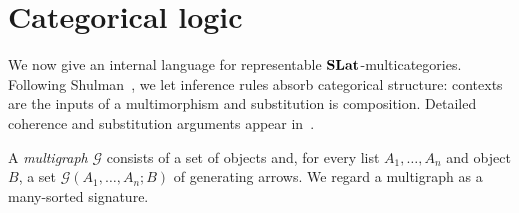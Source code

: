 \section{Categorical logic}
\label{sec:type-theory}

We now give an internal language for representable
$\mathbf{SLat}$-multicategories.  Following Shulman~\cite{shulman2016categorical},
we let inference rules absorb categorical structure: contexts are the inputs
of a multimorphism and substitution is composition.  Detailed coherence and
substitution arguments appear in~.

\begin{definition}
A \emph{multigraph} $\mathcal{G}$ consists of a set of objects and, for every list $A_1,\ldots,A_n$ and object $B$, a set $\mathcal{G}(A_1,\ldots,A_n;B)$ of generating arrows.  We regard a multigraph as a many-sorted signature.
\end{definition}

